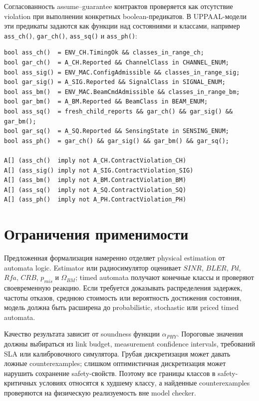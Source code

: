 \documentclass[10pt,a4paper]{article}
\newcommand{\code}[1]{\texttt{#1}}
\begin{document}
Согласованность assume--guarantee контрактов проверяется как отсутствие violation при выполнении конкретных boolean-предикатов. В UPPAAL-модели эти предикаты задаются как функции над состояниями и классами, например \code{ass\_ch()}, \code{gar\_ch()}, \code{ass\_sq()} и \code{ass\_ph()}:
\begin{verbatim}
bool ass_ch()  = ENV_CH.TimingOk && classes_in_range_ch;
bool gar_ch()  = A_CH.Reported && ChannelClass in CHANNEL_ENUM;
bool ass_sig() = ENV_MAC.ConfigAdmissible && classes_in_range_sig;
bool gar_sig() = A_SIG.Reported && SignalClass in SIGNAL_ENUM;
bool ass_bm()  = ENV_MAC.BeamCmdAdmissible && classes_in_range_bm;
bool gar_bm()  = A_BM.Reported && BeamClass in BEAM_ENUM;
bool ass_sq()  = fresh_child_reports && gar_ch() && gar_sig() && gar_bm();
bool gar_sq()  = A_SQ.Reported && SensingState in SENSING_ENUM;
bool ass_ph()  = gar_ch() && gar_sig() && gar_bm() && gar_sq();

A[] (ass_ch()  imply not A_CH.ContractViolation_CH)
A[] (ass_sig() imply not A_SIG.ContractViolation_SIG)
A[] (ass_bm()  imply not A_BM.ContractViolation_BM)
A[] (ass_sq()  imply not A_SQ.ContractViolation_SQ)
A[] (ass_ph()  imply not A_PH.ContractViolation_PH)
\end{verbatim}

\section{Ограничения применимости}

Предложенная формализация намеренно отделяет physical estimation от automata logic. Estimator или радиосимулятор оценивает \(SINR\), \(BLER\), \(Pd\), \(Rfa\), \(CRB\), \(p_{mis}\) и \(\Omega_{BM}\); timed automata получают конечные классы и проверяют своевременную реакцию. Если требуется доказывать распределения задержек, частоты отказов, среднюю стоимость или вероятность достижения состояния, модель должна быть расширена до probabilistic, stochastic или priced timed automata.

Качество результата зависит от soundness функции \(\alpha_{PHY}\). Пороговые значения должны выбираться из link budget, measurement confidence intervals, требований SLA или калибровочного симулятора. Грубая дискретизация может давать ложные counterexamples; слишком оптимистичная дискретизация может нарушить сохранение safety-свойств. Поэтому все границы классов в safety-критичных условиях относятся к худшему классу, а найденные counterexamples проверяются на физическую реализуемость вне model checker.
\end{document}

